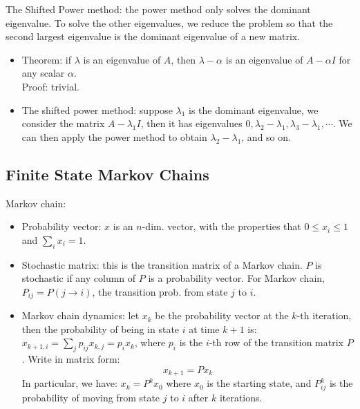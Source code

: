 \documentclass{report}
\begin{document}
The Shifted Power method: the power method only solves the dominant eigenvalue. To solve the other eigenvalues, we reduce the problem so that the second largest eigenvalue is the dominant eigenvalue of a new matrix.  
\begin{itemize}
\item Theorem: if $\lambda$ is an eigenvalue of $A$, then $\lambda - \alpha$ is an eigenvalue of $A - \alpha I$ for any scalar $\alpha$. \\
Proof: trivial. 

\item The shifted power method: suppose $\lambda_1$ is the dominant eigenvalue, we consider the matrix $A - \lambda_1 I$, then it has eigenvalues $0, \lambda_2 - \lambda_1, \lambda_3 - \lambda_1, \cdots$. We can then apply the power method to obtain $\lambda_2 - \lambda_1$, and so on. 
\end{itemize}

\subsection{Finite State Markov Chains}

Markov chain: 
\begin{itemize}
\item Probability vector: $x$ is an $n$-dim. vector, with the properties that $0 \leq x_i \leq 1$ and $\sum_i x_i = 1$. 

\item Stochastic matrix: this is the transition matrix of a Markov chain. $P$ is stochastic if any column of $P$ is a probability vector. For Markov chain, $P_{ij} = P(j \rightarrow i)$, the transition prob. from state $j$ to $i$. 

\item Markov chain dynamics: let $x_k$ be the probability vector at the $k$-th iteration, then the probability of being in state $i$ at time $k+1$ is: $x_{k+1,i} = \sum_j p_{ij} x_{k,j} = p_i x_k$, where $p_i$ is the $i$-th row of the transition matrix $P$. Write in matrix form:  
\begin{equation}
x_{k+1} = P x_k
\end{equation}
In particular, we have: $x_k = P^k x_0$ where $x_0$ is the starting state, and $P^k_{ij}$ is the probability of moving from state $j$ to $i$ after $k$ iterations. 

\end{itemize}
\end{document}
